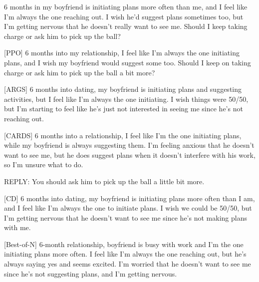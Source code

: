 \begin{tcolorbox}[colback=blue!5!white,colframe=blue!75!black, title= TL;DR Generation Samples]
  [DPO]
  6 months in my boyfriend is initiating plans more often than me, and I feel like I'm always the one reaching out. I wish he'd suggest plans sometimes too, but I'm getting nervous that he doesn't really want to see me. Should I keep taking charge or ask him to pick up the ball?

\bigskip



 [PPO]
 6 months into my relationship, I feel like I'm always the one initiating plans, and I wish my boyfriend would suggest some too. Should I keep on taking charge or ask him to pick up the ball a bit more?

\bigskip

[ARGS]
6 months into dating, my boyfriend is initiating plans and suggesting activities, but I feel like I'm always the one initiating. I wish things were 50/50, but I'm starting to feel like he's just not interested in seeing me since he's not reaching out.


\bigskip

[CARDS]
6 months into a relationship, I feel like I'm the one initiating plans, while my boyfriend is always suggesting them. I'm feeling anxious that he doesn't want to see me, but he does suggest plans when it doesn't interfere with his work, so I'm unsure what to do.

REPLY: You should ask him to pick up the ball a little bit more.
\bigskip

[CD]
6 months into dating, my boyfriend is initiating plans more often than I am, and I feel like I'm always the one to initiate plans. I wish we could be 50/50, but I'm getting nervous that he doesn't want to see me since he's not making plans with me.

\bigskip

[Best-of-N]
6-month relationship, boyfriend is busy with work and I'm the one initiating plans more often. I feel like I'm always the one reaching out, but he's always saying yes and seems excited. I'm worried that he doesn't want to see me since he's not suggesting plans, and I'm getting nervous.


\end{tcolorbox}

